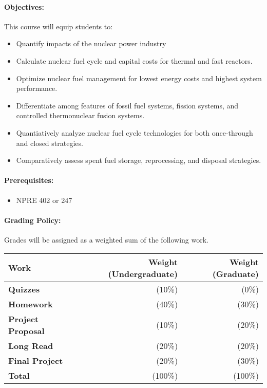 \documentclass[11pt, a4paper]{article}
\begin{document}
\paragraph{Objectives:} 

This course will equip students to:

\begin{itemize}
\item Quantify impacts of the nuclear power industry
\item Calculate nuclear fuel cycle and capital costs for thermal and fast reactors.
\item Optimize nuclear fuel management for lowest energy costs and highest system performance.
\item Differentiate among features of fossil fuel systems, fission systems, and controlled thermonuclear fusion systems.
\item Quantiatively analyze nuclear fuel cycle technologies for both once-through and closed strategies.
\item Comparatively assess spent fuel storage, reprocessing, and disposal strategies.
\end{itemize}

\paragraph{Prerequisites:} 
\begin{itemize}
\item NPRE 402 or 247
\end{itemize}

\paragraph{Grading Policy:} Grades will be assigned as a weighted sum of the 
following work.

\begin{table}[h]
\begin{tabularx}{\textwidth}{Xrr}
        \textbf{Work} & \textbf{Weight (Undergraduate)} & \textbf{Weight (Graduate)} \\
\hline
\textbf{Quizzes}           & (10\%)   & (0\%)\\
\textbf{Homework}          & (40\%)   & (30\%)\\
\textbf{Project Proposal}  & (10\%)   & (20\%)\\
\textbf{Long Read}         & (20\%)   & (20\%)\\
\textbf{Final Project}     & (20\%)   & (30\%)\\
\hline
\textbf{Total}             & (100\%) & (100\%)\\
\end{tabularx}
\end{table}
\end{document}
